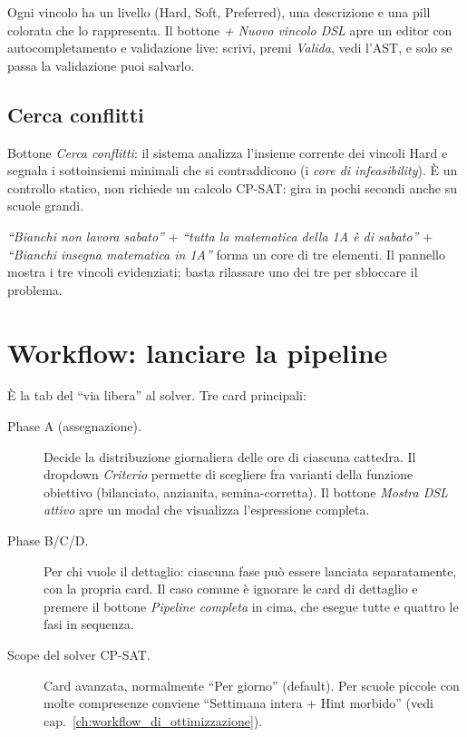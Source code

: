 Ogni vincolo ha un livello (Hard, Soft, Preferred), una
descrizione e una pill colorata che lo rappresenta. Il bottone
\emph{+ Nuovo vincolo DSL} apre un editor con autocompletamento
e validazione live: scrivi, premi \emph{Valida}, vedi l'AST, e
solo se passa la validazione puoi salvarlo.

\subsection{Cerca conflitti}

Bottone \emph{Cerca conflitti}: il sistema analizza l'insieme
corrente dei vincoli Hard e segnala i sottoinsiemi minimali che
si contraddicono (i \emph{core di infeasibility}). \`E un
controllo statico, non richiede un calcolo CP-SAT: gira in pochi
secondi anche su scuole grandi.

\begin{esempiobox}[title=Conflitto tipico]
\emph{``Bianchi non lavora sabato''} + \emph{``tutta la
matematica della 1A \`e di sabato''} + \emph{``Bianchi insegna
matematica in 1A''} forma un core di tre elementi. Il pannello
mostra i tre vincoli evidenziati; basta rilassare uno dei tre
per sbloccare il problema.
\end{esempiobox}


\section{Workflow: lanciare la pipeline}
\label{sec:tab_workflow}

\`E la tab del ``via libera'' al solver. Tre card principali:

\begin{description}
\item[Phase A (assegnazione).] Decide la distribuzione
  giornaliera delle ore di ciascuna cattedra. Il dropdown
  \emph{Criterio} permette di scegliere fra varianti della
  funzione obiettivo (bilanciato, anzianita, semina-corretta).
  Il bottone \emph{Mostra DSL attivo} apre un modal che
  visualizza l'espressione completa.
\item[Phase B/C/D.] Per chi vuole il dettaglio: ciascuna fase
  pu\`o essere lanciata separatamente, con la propria card. Il
  caso comune \`e ignorare le card di dettaglio e premere il
  bottone \emph{Pipeline completa} in cima, che esegue tutte
  e quattro le fasi in sequenza.
\item[Scope del solver CP-SAT.] Card avanzata, normalmente
  ``Per giorno'' (default). Per scuole piccole con molte
  compresenze conviene ``Settimana intera + Hint morbido''
  (vedi cap.~\ref{ch:workflow_di_ottimizzazione}).
\end{description}

